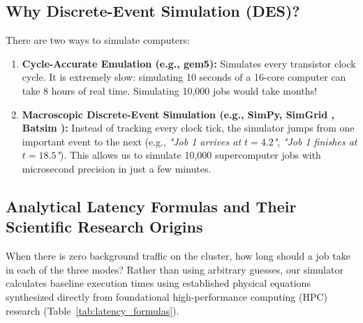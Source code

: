 \documentclass[11pt,a4paper]{article}
\begin{document}
\subsection{Why Discrete-Event Simulation (DES)?}
There are two ways to simulate computers:
\begin{enumerate}[noitemsep, topsep=1pt]
    \item \textbf{Cycle-Accurate Emulation (e.g., gem5):} Simulates every transistor clock cycle. It is extremely slow: simulating 10 seconds of a 16-core computer can take 8 hours of real time. Simulating 10,000 jobs would take months!
    \item \textbf{Macroscopic Discrete-Event Simulation (e.g., SimPy, SimGrid \cite{casanova2014simgrid}, Batsim \cite{dutot2016batsim}):} Instead of tracking every clock tick, the simulator jumps from one important event to the next (e.g., \textit{"Job 1 arrives at $t=4.2$"}, \textit{"Job 1 finishes at $t=18.5$"}). This allows us to simulate 10,000 supercomputer jobs with microsecond precision in just a few minutes.
\end{enumerate}

\subsection{Analytical Latency Formulas and Their Scientific Research Origins}
When there is zero background traffic on the cluster, how long should a job take in each of the three modes? Rather than using arbitrary guesses, our simulator calculates baseline execution times using established physical equations synthesized directly from foundational high-performance computing (HPC) research (Table~\ref{tab:latency_formulas}).
\end{document}
